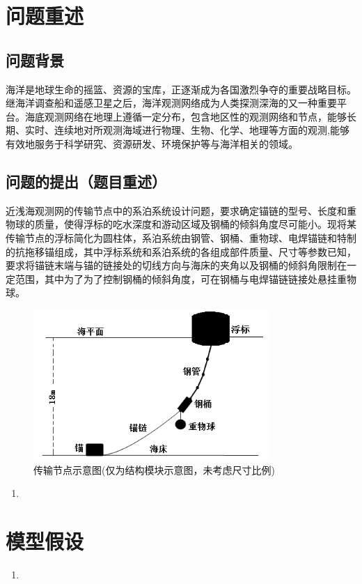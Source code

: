 \documentclass{cumcm}
\begin{document}
\newpage
\section{问题重述}
\subsection{问题背景}
海洋是地球生命的摇篮、资源的宝库，正逐渐成为各国激烈争夺的重要战略目标。继海洋调查船和遥感卫星之后，海洋观测网络成为人类探测深海的又一种重要平台。海底观测网络在地理上遵循一定分布，包含地区性的观测网络和节点，能够长期、实时、连续地对所观测海域进行物理、生物、化学、地理等方面的观测,能够有效地服务于科学研究、资源研发、环境保护等与海洋相关的领域。

\subsection{问题的提出（题目重述）}
近浅海观测网的传输节点中的系泊系统设计问题，要求确定锚链的型号、长度和重物球的质量，使得浮标的吃水深度和游动区域及钢桶的倾斜角度尽可能小。现将某传输节点的浮标简化为圆柱体，系泊系统由钢管、钢桶、重物球、电焊锚链和特制的抗拖移锚组成，其中浮标系统和系泊系统的各组成部件质量、尺寸等参数已知，要求将锚链末端与锚的链接处的切线方向与海床的夹角以及钢桶的倾斜角限制在一定范围，其中为了为了控制钢桶的倾斜角度，可在钢桶与电焊锚链链接处悬挂重物球。
\begin{figure}[H]
\centering
\includegraphics[width=0.8\textwidth]{img/title.jpg}
\caption{传输节点示意图(仅为结构模块示意图，未考虑尺寸比例)}\label{fig-buoy}
\end{figure}	

\begin{enumerate}[(1)]
	\item 

\end{enumerate}

\section{模型假设}
\begin{enumerate}
	\item

\end{enumerate}
\end{document}
